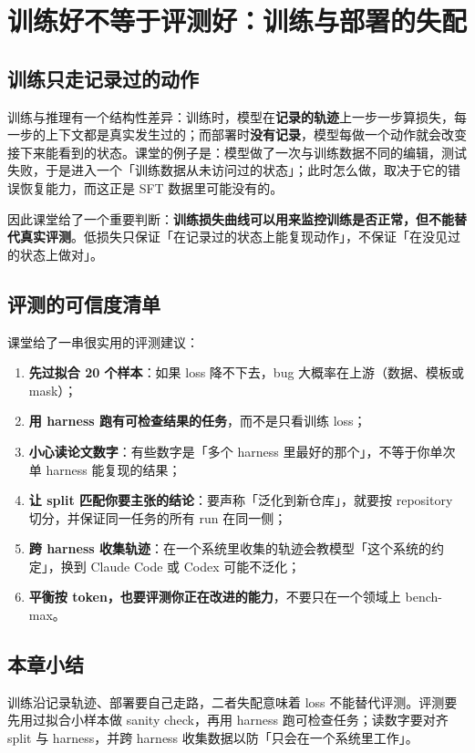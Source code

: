 \documentclass[a4paper]{article}
\begin{document}
\section{训练好不等于评测好：训练与部署的失配}

\subsection{训练只走记录过的动作}

训练与推理有一个结构性差异：训练时，模型在\textbf{记录的轨迹}上一步一步算损失，每一步的上下文都是真实发生过的；而部署时\textbf{没有记录}，模型每做一个动作就会改变接下来能看到的状态。课堂的例子是：模型做了一次与训练数据不同的编辑，测试失败，于是进入一个「训练数据从未访问过的状态」；此时怎么做，取决于它的错误恢复能力，而这正是 SFT 数据里可能没有的。

因此课堂给了一个重要判断：\textbf{训练损失曲线可以用来监控训练是否正常，但不能替代真实评测}。低损失只保证「在记录过的状态上能复现动作」，不保证「在没见过的状态上做对」。

\subsection{评测的可信度清单}

课堂给了一串很实用的评测建议：

\begin{enumerate}
\item \textbf{先过拟合 20 个样本}：如果 loss 降不下去，bug 大概率在上游（数据、模板或 mask）；
\item \textbf{用 harness 跑有可检查结果的任务}，而不是只看训练 loss；
\item \textbf{小心读论文数字}：有些数字是「多个 harness 里最好的那个」，不等于你单次单 harness 能复现的结果；
\item \textbf{让 split 匹配你要主张的结论}：要声称「泛化到新仓库」，就要按 repository 切分，并保证同一任务的所有 run 在同一侧；
\item \textbf{跨 harness 收集轨迹}：在一个系统里收集的轨迹会教模型「这个系统的约定」，换到 Claude Code 或 Codex 可能不泛化；
\item \textbf{平衡按 token，也要评测你正在改进的能力}，不要只在一个领域上 bench-max。
\end{enumerate}

\subsection{本章小结}
训练沿记录轨迹、部署要自己走路，二者失配意味着 loss 不能替代评测。评测要先用过拟合小样本做 sanity check，再用 harness 跑可检查任务；读数字要对齐 split 与 harness，并跨 harness 收集数据以防「只会在一个系统里工作」。
\end{document}
